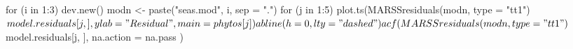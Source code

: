\begin{Schunk}
\begin{Sinput}
 for (i in 1:3) {
   dev.new()
   modn <- paste("seas.mod", i, sep = ".")
   for (j in 1:5) {
     plot.ts(MARSSresiduals(modn, type = "tt1")$model.residuals[j, ],
       ylab = "Residual", main = phytos[j]
     )
     abline(h = 0, lty = "dashed")
     acf(MARSSresiduals(modn, type = "tt1")$model.residuals[j, ],
       na.action = na.pass
     )
   }
 }
\end{Sinput}
\end{Schunk}
